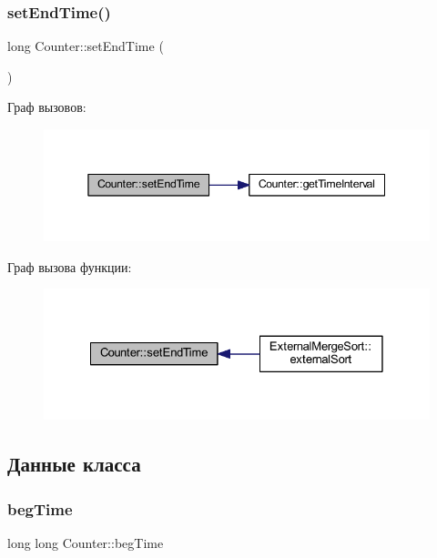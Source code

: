 \subsubsection{\texorpdfstring{set\+End\+Time()}{setEndTime()}}
{\footnotesize\ttfamily long Counter\+::set\+End\+Time (\begin{DoxyParamCaption}{ }\end{DoxyParamCaption})}

Граф вызовов\+:\nopagebreak
\begin{figure}[H]
\begin{center}
\leavevmode
\includegraphics[width=345pt]{class_counter_a338ac4f04d6f5924aa7ace3b14d9ffb9_cgraph}
\end{center}
\end{figure}
Граф вызова функции\+:\nopagebreak
\begin{figure}[H]
\begin{center}
\leavevmode
\includegraphics[width=328pt]{class_counter_a338ac4f04d6f5924aa7ace3b14d9ffb9_icgraph}
\end{center}
\end{figure}


\subsection{Данные класса}
\hypertarget{class_counter_ae2f8fa6947d7daa4b977d4aae2ee3c43}{}\label{class_counter_ae2f8fa6947d7daa4b977d4aae2ee3c43} 
\subsubsection{\texorpdfstring{beg\+Time}{begTime}}
{\footnotesize\ttfamily long long Counter\+::beg\+Time\hspace{0.3cm}{\ttfamily [private]}}


